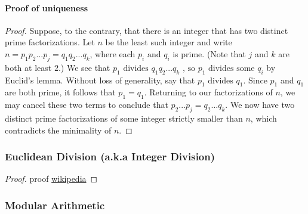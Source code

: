 \documentclass[../MathsNotesBase.tex]{subfiles}
\begin{document}
{		\paragraph{Proof of uniqueness}
		\begin{proof}
			Suppose, to the contrary, that there is an integer that has two distinct prime factorizations. Let $ n $ be the least such integer and write $ n = p_1 p_2 ... p_j = q_1 q_2 ... q_k $, where each $ p_i \text{ and } q_i $ is prime. (Note that $ j $ and $ k $ are both at least $ 2 $.) We see that $ p_1 \text{ divides } q_1 q_2 ... q_k\text{ , so } p_1\text{  divides some } q_i $ by Euclid's lemma. Without loss of generality, say that $ p_1 \text{ divides } q_1 $. Since $ p_1 $ and $ q_1 $ are both prime, it follows that $ p_1 = q_1 $. Returning to our factorizations of $ n $, we may cancel these two terms to conclude that $ p_2 ... p_j = q_2 ... q_k $. We now have two distinct prime factorizations of some integer strictly smaller than $ n $, which contradicts the minimality of $ n $.
		\end{proof}
	
		
		\biggerskip
		\subsubsection{Euclidean Division (a.k.a Integer Division)}
		\begin{proof}
			proof \href{https://en.wikipedia.org/wiki/Euclidean_division\#Proof}{wikipedia}
		\end{proof}
		
		
		\pagebreak
		\subsubsection{Modular Arithmetic}\bigskip
		
}
\end{document}
